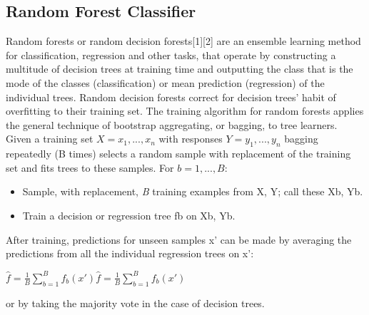 \documentclass[12pt]{article}
\begin{document}
		\subsection{Random Forest Classifier}
		\begin{justify}
			Random forests or random decision forests[1][2] are an ensemble learning method for classification, regression and other tasks, that operate by constructing a multitude of decision trees at training time and outputting the class that is the mode of the classes (classification) or mean prediction (regression) of the individual trees. Random decision forests correct for decision trees' habit of overfitting to their training set.
			The training algorithm for random forests applies the general technique of bootstrap aggregating, or bagging, to tree learners. Given a training set $ X = x_{1}, ..., x_{n}$  with responses $ Y = y_{1}, ..., y_{n} $ bagging repeatedly (B times) selects a random sample with replacement of the training set and fits trees to these samples. For $ b = 1, ..., B $:
			\begin{itemize}
				\item Sample, with replacement, \textit{B} training examples from X, Y; call these Xb, Yb.
				\item Train a decision or regression tree fb on Xb, Yb.
			\end{itemize}
		After training, predictions for unseen samples x' can be made by averaging the predictions from all the individual regression trees on x':
		\begin{center}
			$ {\displaystyle {\hat {f}}={\frac {1}{B}}\sum _{b=1}^{B}f_{b}(x')} {\displaystyle {\hat {f}}={\frac {1}{B}}\sum _{b=1}^{B}f_{b}(x')} $
		\end{center}
		or by taking the majority vote in the case of decision trees.

\end{justify}
\end{document}
